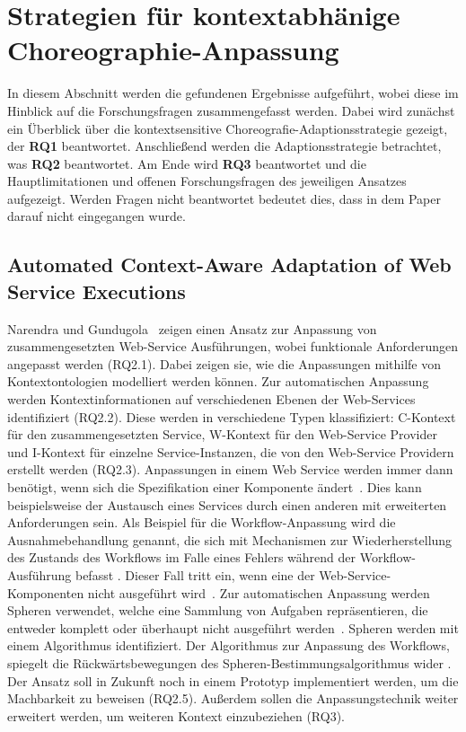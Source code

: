 \documentclass[conference,compsoc,ngerman]{IEEEtran}
\begin{document}
\section{Strategien für kontextabhänige Choreographie-Anpassung}\label{s:contextAwareResults}
In diesem Abschnitt werden die gefundenen Ergebnisse aufgeführt, wobei diese im Hinblick auf die Forschungsfragen zusammengefasst werden. Dabei wird zunächst  ein Überblick über die kontextsensitive Choreografie-Adaptionsstrategie gezeigt, der \textbf{RQ1} beantwortet. Anschließend werden die Adaptionsstrategie betrachtet, was \textbf{RQ2} beantwortet. Am Ende wird \textbf{RQ3} beantwortet und die Hauptlimitationen und offenen Forschungsfragen des jeweiligen Ansatzes aufgezeigt.
Werden Fragen nicht beantwortet bedeutet dies, dass in dem Paper darauf nicht eingegangen wurde.

\subsection{Automated Context-Aware Adaptation of Web Service Executions}
Narendra und Gundugola~\cite{narendra2006automated} zeigen einen Ansatz zur Anpassung von zusammengesetzten Web-Service Ausführungen, wobei funktionale Anforderungen angepasst werden (RQ2.1). Dabei zeigen sie, wie die Anpassungen mithilfe von Kontextontologien modelliert werden können. Zur automatischen Anpassung werden Kontextinformationen auf verschiedenen Ebenen der Web-Services identifiziert (RQ2.2). Diese werden in verschiedene Typen klassifiziert: C-Kontext für den zusammengesetzten Service, W-Kontext für den Web-Service Provider und I-Kontext für einzelne Service-Instanzen, die von den Web-Service Providern erstellt werden (RQ2.3)\cite{narendra2006automated}. Anpassungen in einem Web Service werden immer dann benötigt, wenn sich die Spezifikation einer Komponente ändert~\cite{narendra2006automated}. Dies kann beispielsweise der Austausch eines Services durch einen anderen mit erweiterten Anforderungen sein.
Als Beispiel für die Workflow-Anpassung wird die Ausnahmebehandlung genannt, die sich mit Mechanismen zur Wiederherstellung des Zustands des Workflows im Falle eines Fehlers während der Workflow-Ausführung befasst \cite{narendra2006automated}. Dieser Fall tritt ein, wenn eine der Web-Service-Komponenten nicht ausgeführt wird~\cite{narendra2006automated}.
Zur automatischen Anpassung werden Spheren verwendet, welche eine Sammlung von Aufgaben repräsentieren, die entweder komplett oder überhaupt nicht ausgeführt werden~\cite{narendra2006automated}. Spheren werden mit einem Algorithmus identifiziert. Der Algorithmus zur Anpassung des Workflows, spiegelt die Rückwärtsbewegungen des Spheren-Bestimmungsalgorithmus wider \cite{narendra2006automated}.
Der Ansatz soll in Zukunft noch in einem Prototyp implementiert werden, um die Machbarkeit zu beweisen (RQ2.5). Außerdem sollen die Anpassungstechnik weiter erweitert werden, um weiteren Kontext einzubeziehen (RQ3).
\end{document}
